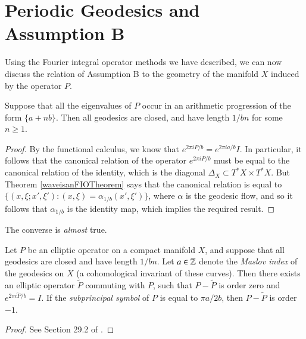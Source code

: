 







\section{Periodic Geodesics and Assumption B} \label{sec:PeriodicGeodesics}

Using the Fourier integral operator methods we have described, we can now discuss the relation of Assumption B to the geometry of the manifold $X$ induced by the operator $P$.

\begin{theorem}
  Suppose that all the eigenvalues of $P$ occur in an arithmetic progression of the form $\{ a + n b \}$. Then all geodesics are closed, and have length $1/bn$ for some $n \geq 1$.
\end{theorem}
\begin{proof}
  By the functional calculus, we know that $e^{2 \pi i P/b} = e^{2 \pi i a/b} I$. In particular, it follows that the canonical relation of the operator $e^{2 \pi i P/b}$ must be equal to the canonical relation of the identity, which is the diagonal $\Delta_X \subset T^* X \times T^* X$. But Theorem \ref{waveisanFIOTheorem} says that the canonical relation is equal to $\{ (x,\xi;x',\xi'): (x,\xi) = \alpha_{1/b}(x',\xi') \}$, where $\alpha$ is the geodesic flow, and so it follows that $\alpha_{1/b}$ is the identity map, which implies the required result.
\end{proof}

The converse is \emph{almost} true.

\begin{theorem}
  Let $P$ be an elliptic operator on a compact manifold $X$, and suppose that all geodesics are closed and have length $1/bn$. Let $a \in \operatorname{\mathbb{Z}}$ denote the \emph{Maslov index} of the geodesics  on $X$ (a cohomological invariant of these curves). Then there exists an elliptic operator $\tilde{P}$ commuting with $P$, such that $P - \tilde{P}$ is order zero and $e^{2 \pi i \tilde{P} / b} = I$. If the \emph{subprincipal symbol} of $P$ is equal to $\pi a / 2 b$, then $P - \tilde{P}$ is order $-1$.
\end{theorem}
\begin{proof}
  See Section 29.2 of \cite{Hormander4}.
\end{proof}

